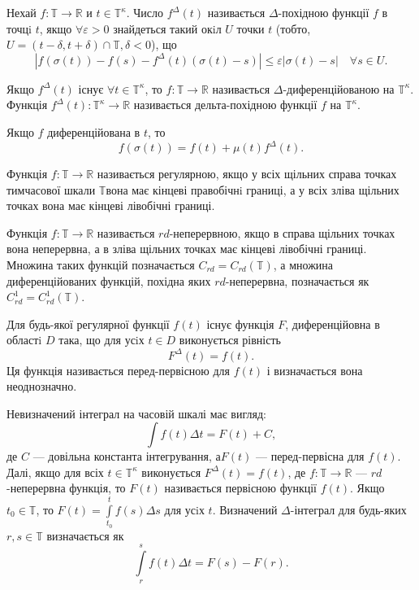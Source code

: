 \begin{definition}
    Нехай $f:\mathbb{T} \rightarrow \mathbb{R}$ и $t \in \mathbb{T}^\kappa$.
    Число $f^{\Delta}(t)$ називається $\Delta$-похідною функції $f$ в точцi $t$,
    якщо $\forall \varepsilon > 0$ знайдеться такий окiл
    $U$ точки $t$ (тобто, $U = (t - \delta, t + \delta) \cap \mathbb{T}, \delta < 0$),
    що
    \[
    \left|f(\sigma(t)) - f(s) - f^{\Delta}(t)(\sigma(t)-s)\right| \leqslant
        \varepsilon\left|\sigma(t) - s\right| \quad \forall s \in U.
    \]
\end{definition}

\begin{definition}
    Якщо $f^{\Delta}(t)$ існує $\forall t \in \mathbb{T}^\kappa$,
    то $f:\mathbb{T} \rightarrow \mathbb{R}$ називається $\Delta$-диференційованою
    на $\mathbb{T}^\kappa$. Функція $f^{\Delta}(t): \mathbb{T}^\kappa \rightarrow \mathbb{R}$
   називається дельта-похідною функції $f$ на $\mathbb{T}^\kappa$.
\end{definition}

Якщо $f$ диференційована в $t$, то
\[
    f(\sigma(t)) = f(t) + \mu(t)f^{\Delta}(t).
\]

\begin{definition}
    Функція $f:\mathbb{T} \rightarrow \mathbb{R}$ називається регулярною, якщо у всіх щільних справа точках тимчасової шкали $\mathbb{T}$вона має кінцеві правобічнi границі, а у всіх зліва щільних точках вона має кінцеві лівобічні границі.
\end{definition}

\begin{definition}
    Функція $f:\mathbb{T} \rightarrow \mathbb{R}$ називається $rd$-неперервною,
   якщо в справа щільних точках вона неперервна, а в зліва щільних точках має кінцеві лівобічні границі. Множина таких функцій позначається
    $C_{rd} = C_{rd}(\mathbb{T})$, а множина диференційованих функцій,
    похідна яких $rd$-неперервна, позначається як
    $C_{rd}^1 = C_{rd}^1(\mathbb{T})$.
\end{definition}


\begin{definition}
Для будь-якої регулярної функції $f(t)$ існує функція $F$,
диференційовна в областi $D$ така, що для усiх $t \in D$
виконується рівність $$F^{\Delta}(t) = f(t).$$
Ця функція називається перед-первісною для $f(t)$ і
визначається вона неоднозначно.
\end{definition}

Невизначений інтеграл на часовій шкалі має вигляд:
\[
    \int{f(t) \Delta t} = F(t) + C,
\]
де $C$ --- довільна константа інтегрування, а$F(t)$ --- перед-первісна для $f(t)$.
Далі, якщо для всіх $t \in \mathbb{T}^\kappa$ виконується $F^{\Delta}(t) =
f(t)$, де $f:\mathbb{T}\rightarrow\mathbb{R}$ --- $rd$-неперервна функція, то
$F(t)$ називається первісною функції $f(t)$. Якщо $t_0 \in \mathbb{T}$, то
$\displaystyle F(t) = \int\limits_{t_0}^t{f(s) \Delta s}$ для усiх $t$.
Визначений $\Delta$-інтеграл для будь-яких $r,s \in \mathbb{T}$ визначається як
\[
    \int\limits_r^s{f(t)\Delta t} = F(s) - F(r).
\]
